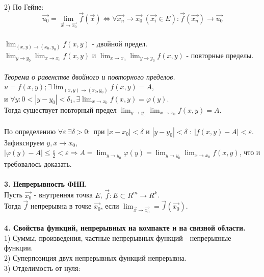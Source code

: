 \documentclass[12pt]{article}
\begin{document}
2) По Гейне:\\
$$\overrightarrow{u_0} = \lim_{\overrightarrow{x}\to\overrightarrow{x_0}} \overrightarrow{f}(\overrightarrow{x}) \iff \forall \overrightarrow{x_n} \rightarrow \overrightarrow{x_0} \  (\overrightarrow{x_i} \in E) : \overrightarrow{f} (\overrightarrow{x_n}) \rightarrow \overrightarrow{u_0}$$\\
$\lim_{(x,y)\to(x_0,y_0)} f(x,y)$ - двойной предел.\\
$\lim_{y\to y_0}\lim_{x\to x_0} f(x,y)$ и $\lim_{x\to x_0}\lim_{y\to y_0} f(x,y)$ - повторные пределы.\\
\\
\label{question2_3}\emph{Теорема о равенстве двойного и повторного пределов.}\\
$u = f(x,y); \exists \lim_{(x,y)\to(x_0,y_0)} f(x,y) = A$, \\и $\forall y : 0 < |y-y_0| < \delta_1, \exists \lim_{x\to x_0} f(x,y) = \varphi (y)$.\\
Тогда существует повторный предел $\lim_{y\to y_0} \lim_{x\to x_0} f(x,y) = A$.\\
\\
По определению $\forall \varepsilon \ \exists \delta >0:$ при $|x-x_0|<\delta$ и $|y-y_0|<\delta$ : $|f(x,y)-A|<\varepsilon$.\\
Зафиксируем $y, x\to x_0$, $|\varphi (y) - A| \leq \frac{\varepsilon}{2} < \varepsilon \Rightarrow A = \lim_{y\to y_0} \varphi (y) = \lim_{y\to y_0} \lim_{x\to x_0} f(x,y)$, что и требовалось доказать.\\
\\
\label{question3}\textbf{3. Непрерывность ФНП.}\\
Пусть $\overrightarrow{x_0}$ - внутренняя точка $E$, $\overrightarrow{f} : E \subset R^m \to R^k$.\\
Тогда $\overrightarrow{f}$ непрерывна в точке $\overrightarrow{x_0}$, если $\lim_{\overrightarrow{x}\to\overrightarrow{x_0}}=\overrightarrow{f}(\overrightarrow{x_0})$.\\
\\
\label{question4}\textbf{4. Свойства функций, непрерывных на компакте и на связной области.}\\
1) Суммы, произведения, частные непрерывных функций - непрерывные функции.\\
2) Суперпозиция двух непрерывных функций непрерывна.\\
3) Отделимость от нуля:\\
\end{document}
